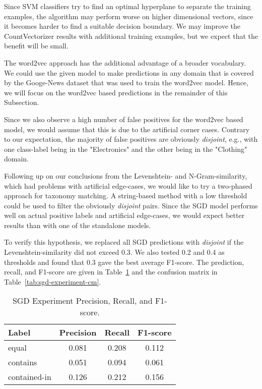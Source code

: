 Since SVM classifiers try to find an optimal hyperplane to separate the training examples, the algorithm may
perform worse on higher dimensional vectors, since it becomes harder to find a suitable decision boundary.
We may improve the CountVectorizer results with additional training examples, but we expect that the benefit will be small.

The word2vec approach has the additional advantage of a broader vocabulary.
We could use the given model to make predictions in any domain that is covered by the Googe-News dataset that was used to
train the word2vec model.
Hence, we will focus on the word2vec based predictions in the remainder of this Subsection.

Since we also observe a high number of false positives for the word2vec based model, we would assume that this is due to
the artificial corner cases.
Contrary to our expectation, the majority of false positives are obviously \emph{disjoint}, e.g., with one class-label being in
the "Electronics" and the other being in  the  "Clothing" domain.

Following up on our conclusions from the Levenshtein- and N-Gram-similarity, which had problems with artificial edge-cases,
we would like to try a two-phased approach for taxonomy matching.
A string-based method with a low threshold could be  used to filter the obviously \emph{disjoint} pairs.
Since the SGD model performs well on actual positive labels and artificial edge-cases, we would expect better results than
with one of the standalone models.

To verify this hypothesis, we replaced all SGD predictions with \emph{disjoint} if the Levenshtein-similarity did not exceed 0.3.
We also tested 0.2 and 0.4 as thresholds and found  that 0.3 gave the best average F1-score.
The prediction, recall, and  F1-score are given in Table~\ref{tab:sgd-experiment-evaluation} and the confusion matrix
in Table~\ref{tab:sgd-experiment-cm}.

\begin{table}[htbp]
    \begin{center}
        \begin{tabular}{l|ccc}
            Label & Precision & Recall & F1-score \\
            \hline
            equal & 0.081 & 0.208 & 0.112 \\
            contains & 0.051 & 0.094 & 0.061 \\
            contained-in & 0.126 & 0.212 & 0.156 \\
        \end{tabular}
        \caption{SGD Experiment Precision, Recall, and F1-score.}
        \label{tab:sgd-experiment-evaluation}
    \end{center}
\end{table}

